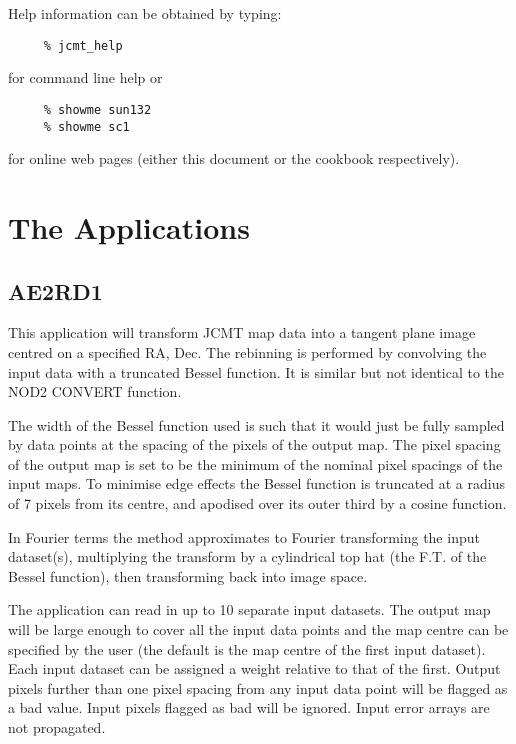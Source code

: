 \documentclass[twoside,11pt]{article}
\newcommand{\xlabel}[1]{}
\renewcommand{\_}{\texttt{\symbol{95}}}
\begin{document}
Help information can be obtained by typing:

\begin{verbatim}
     % jcmt_help
\end{verbatim}

for command line help or

\begin{verbatim}
     % showme sun132
     % showme sc1
\end{verbatim}

for online web pages (either this document or the cookbook respectively).

\goodbreak

\section{The Applications\xlabel{the_applications}}

\subsection{\xlabel{AE2RD1}AE2RD1}

This application will transform JCMT map data into a tangent  plane
image centred on a specified RA, Dec. The rebinning is performed by
convolving the input data with a truncated Bessel function. It is
similar but not identical to the NOD2 CONVERT function. 

The width of the Bessel function used is such that it would just be
fully  sampled by data points at the spacing of the pixels of the
output  map. The pixel spacing of the output map is set to be the
minimum  of the nominal pixel spacings of the input maps. To minimise
edge  effects the Bessel function is truncated at a radius of 7 pixels 
from its centre, and apodised over its outer third by a cosine 
function.

In Fourier terms the method approximates to Fourier transforming the
input dataset(s), multiplying the transform by a cylindrical top hat
(the F.T. of the Bessel function), then transforming back into image
space. 

The application can read in up to 10 separate input datasets. The
output map will be large enough to cover all the input data  points
and the map centre can be specified by the user (the  default is the
map centre of the first input dataset). Each input  dataset can be
assigned a weight relative to that of the first.  Output pixels
further than one pixel spacing from any input data  point will be
flagged as a bad value. Input pixels flagged as bad will be ignored.
Input error arrays are not propagated.
\end{document}
